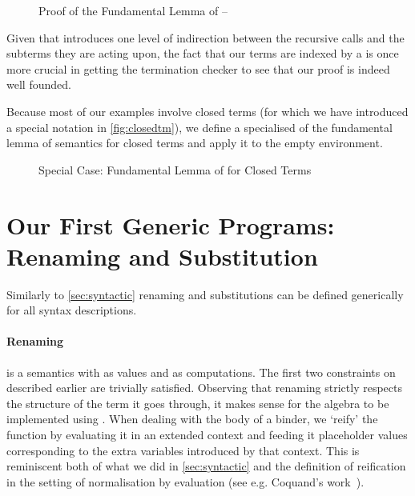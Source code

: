 \begin{figure}[h]
\caption{Proof of the Fundamental Lemma of  -- \label{fig:genbody}}
\end{figure}

Given that  introduces one level of indirection between the recursive
calls and the subterms they are acting upon, the fact that our terms are indexed
by a  is once more crucial in getting the termination checker to see
that our proof is indeed well founded.


Because most of our examples involve closed terms (for which we have introduced a special
notation in \cref{fig:closedtm}), we define a specialised of the fundamental lemma of semantics
for closed terms and apply it to the empty environment.

\begin{figure}[h]
\caption{Special Case: Fundamental Lemma of  for Closed Terms\label{fig:closedsem}}
\end{figure}

\section{Our First Generic Programs: Renaming and Substitution}\label{section:renandsub}

Similarly to \cref{sec:syntactic} renaming and substitutions can be defined generically
for all syntax descriptions.

\paragraph{Renaming} is a semantics with  as values and  as computations.
The first two constraints on  described earlier are trivially satisfied. Observing
that renaming strictly respects the structure of the term it goes through, it makes
sense for the algebra to be implemented using . When dealing with the body
of a binder, we `reify' the  function by evaluating it in an extended
context and feeding it placeholder values corresponding to the extra variables
introduced by that context. This is reminiscent both of what we did in
\cref{sec:syntactic} and the definition of reification in the setting of normalisation
by evaluation (see e.g. Coquand's work~\citeyear{coquand2002formalised}).


